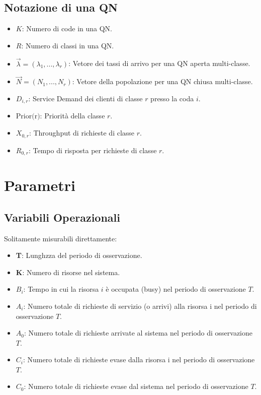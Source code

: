 \documentclass[11pt,a4paper]{article}
\begin{document}
    \subsection{Notazione di una QN}
    \begin{itemize}
        \item \textbf{$K$}: Numero di code in una QN.
        \item \textbf{$R$}: Numero di classi in una QN.
        \item \textbf{$\overrightarrow{\lambda} = (\lambda_1,...,\lambda_r)$}: Vetore dei tassi di arrivo per una QN aperta multi-classe.
        \item \textbf{$\overrightarrow{N} = (N_1,...,N_r)$}: Vetore della popolazione per una QN chiusa multi-classe.
        \item \textbf{$D_{i,r}$}: Service Demand dei clienti di classe $r$ presso la coda $i$.
        \item \textbf{$\text{Prior(r)}$}: Priorità della classe $r$.
        \item \textbf{$X_{0,r}$}: Throughput di richieste di classe $r$.
        \item \textbf{$R_{0,r}$}: Tempo di risposta per richieste di classe $r$.
    \end{itemize}

    \section{Parametri}
    \subsection{Variabili Operazionali}
    Solitamente misurabili direttamente:
    \begin{itemize}
        \item \textbf{T}: Lunghzza del periodo di osservazione.
        \item \textbf{K}: Numero di risorse nel sistema.
        \item \textbf{$B_i$}: Tempo in cui la risorsa $i$ è occupata (busy) nel periodo di osservazione $T$.
        \item \textbf{$A_i$}: Numero totale di richieste di servizio (o arrivi) alla risorsa i nel periodo di osservazione $T$.
        \item \textbf{$A_0$}: Numero totale di richieste arrivate al sistema nel periodo di osservazione $T$.
        \item \textbf{$C_i$}: Numero totale di richieste evase dalla risorsa i nel periodo di osservazione $T$.
        \item \textbf{$C_0$}: Numero totale di richieste evase dal sistema nel periodo di osservazione $T$.
    \end{itemize}
\end{document}
